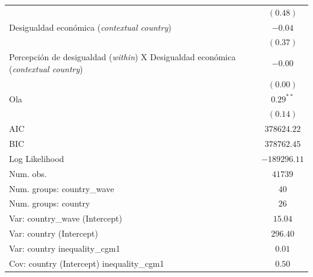 \documentclass[
  12pt,
  a4paper,
]{article}
\begin{document}
\begin{table}[H]
\begin{center}
{\begin{threeparttable}
\begin{tabular}{l c}
                                                                                                  & $(0.48)$      \\
Desigualdad económica (\textit{contextual country})                                               & $-0.04$       \\
                                                                                                  & $(0.37)$      \\
Percepción de desigualdad (\textit{within}) X Desigualdad económica (\textit{contextual country}) & $-0.00$       \\
                                                                                                  & $(0.00)$      \\
Ola                                                                                               & $0.29^{**}$   \\
                                                                                                  & $(0.14)$      \\
\midrule
AIC                                                                                               & $378624.22$   \\
BIC                                                                                               & $378762.45$   \\
Log Likelihood                                                                                    & $-189296.11$  \\
Num. obs.                                                                                         & $41739$       \\
Num. groups: country\_wave                                                                        & $40$          \\
Num. groups: country                                                                              & $26$          \\
Var: country\_wave (Intercept)                                                                    & $15.04$       \\
Var: country (Intercept)                                                                          & $296.40$      \\
Var: country inequality\_cgm1                                                                     & $0.01$        \\
Cov: country (Intercept) inequality\_cgm1                                                         & $0.50$        \\

\end{tabular}
\end{threeparttable}}
\end{center}
\end{table}
\end{document}
